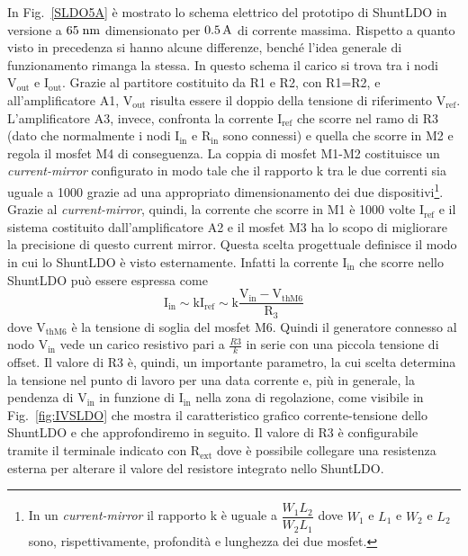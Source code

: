 In Fig.~\ref{SLDO5A} \`e mostrato lo schema elettrico del prototipo di ShuntLDO in versione a $65\rm \; nm$ dimensionato per $0.5\rm \, A$ di corrente massima.
Rispetto a quanto visto in precedenza si hanno alcune differenze, benché l'idea generale di funzionamento rimanga la stessa. 
In questo schema il carico si trova tra i nodi $\mathrm{V_{out}}$ e $\mathrm{I_{out}}$. Grazie al partitore costituito da R1 e R2, con R1=R2, e all'amplificatore A1, $\mathrm{V_{out}}$ risulta essere il doppio della tensione di riferimento $\mathrm{V_{ref}}$.
L'amplificatore A3, invece, confronta la corrente $\mathrm{I_{ref}}$ che scorre nel ramo di R3 (dato che normalmente i nodi $\mathrm{I_{in}}$ e $\mathrm{R_{in}}$ sono connessi) e quella che scorre in M2 e regola il mosfet M4 di conseguenza. 
La coppia di mosfet M1-M2 costituisce un \textit{current-mirror} configurato in modo tale che il rapporto k tra le due correnti sia uguale a 1000 grazie ad una appropriato dimensionamento dei due dispositivi\footnote{
  In un \textit{current-mirror} il rapporto k è uguale a $\dfrac{W_1L_2}{W_2L_1}$ dove $W_1$ e $L_1$ e $W_2$ e $L_2$ sono, rispettivamente, profondità e lunghezza dei due mosfet.
}. 
Grazie al \textit{current-mirror}, quindi, la corrente che scorre in M1 è 1000 volte $\mathrm{I_{ref}}$ e il sistema costituito dall'amplificatore A2 e il mosfet M3 ha lo scopo di migliorare la precisione di questo current mirror.
Questa scelta progettuale definisce il modo in cui lo ShuntLDO è visto esternamente. Infatti la corrente $\mathrm{I_{in}}$ che scorre nello ShuntLDO pu\`o essere espressa come
\begin{equation}
\mathrm{I_{in} \sim k I_{ref} \sim k \frac{V_{in} - V_{thM6}}{R_3}}
\label{eq:IV05amp}
\end{equation}
dove $\mathrm{V_{thM6}}$ \`e la tensione di soglia del mosfet M6. Quindi il generatore connesso al nodo $\mathrm{V_{in}}$ vede un carico resistivo pari a $\frac{R3}{k}$ in serie con una piccola tensione di offset. Il valore di R3 è, quindi, un importante parametro, la cui scelta determina la tensione nel punto di lavoro per una data corrente e, pi\`u in generale, la pendenza di $\mathrm{V_{in}}$ in funzione di $\mathrm{I_{in}}$ nella zona di regolazione, come visibile in Fig.~\ref{fig:IVSLDO} che mostra il caratteristico grafico corrente-tensione dello ShuntLDO e che approfondiremo in seguito.
Il valore di R3 \`e configurabile tramite il terminale indicato con $\mathrm{R_{ext}}$ dove è possibile collegare una resistenza esterna per alterare il valore del resistore integrato nello ShuntLDO.
